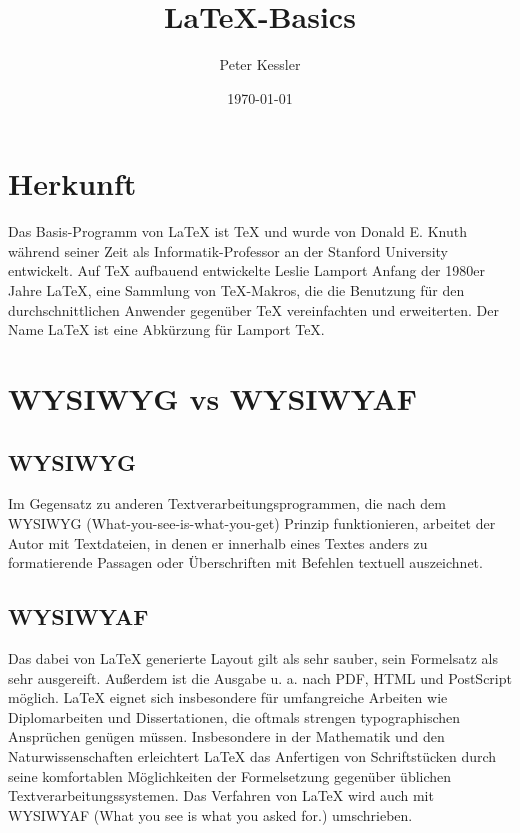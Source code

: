 \documentclass[ 12pt, a4paper, parskip=full]{scrartcl}
\title{\LaTeX-Basics}        %
\author{Peter Kessler}       %
\date{\today}                %
\begin{document}
\maketitle
\thispagestyle{empty}

\pagebreak
\tableofcontents

\pagebreak 
\section{Herkunft}

Das Basis-Programm von LaTeX ist TeX und wurde von Donald E. Knuth während seiner Zeit als Informatik-Professor an der Stanford University entwickelt. Auf TeX aufbauend entwickelte Leslie Lamport Anfang der 1980er Jahre LaTeX, eine Sammlung von TeX-Makros, die die Benutzung für den durchschnittlichen Anwender gegenüber TeX vereinfachten und erweiterten. Der Name LaTeX ist eine Abkürzung für Lamport TeX. 

\pagebreak
\section{WYSIWYG vs WYSIWYAF}

\subsection{WYSIWYG}
Im Gegensatz zu anderen Textverarbeitungsprogrammen, die nach dem WYSIWYG (What-you-see-is-what-you-get) Prinzip funktionieren, arbeitet der Autor mit Textdateien, in denen er innerhalb eines Textes anders zu formatierende Passagen oder Überschriften mit Befehlen textuell auszeichnet.

\subsection{WYSIWYAF}
Das dabei von LaTeX generierte Layout gilt als sehr sauber, sein Formelsatz als sehr ausgereift. Außerdem ist die Ausgabe u. a. nach PDF, HTML und PostScript möglich. LaTeX eignet sich insbesondere für umfangreiche Arbeiten wie Diplomarbeiten und Dissertationen, die oftmals strengen typographischen Ansprüchen genügen müssen. Insbesondere in der Mathematik und den Naturwissenschaften erleichtert LaTeX das Anfertigen von Schriftstücken durch seine komfortablen Möglichkeiten der Formelsetzung gegenüber üblichen Textverarbeitungssystemen. Das Verfahren von LaTeX wird auch mit WYSIWYAF (What you see is what you asked for.) umschrieben. 
\end{document}

